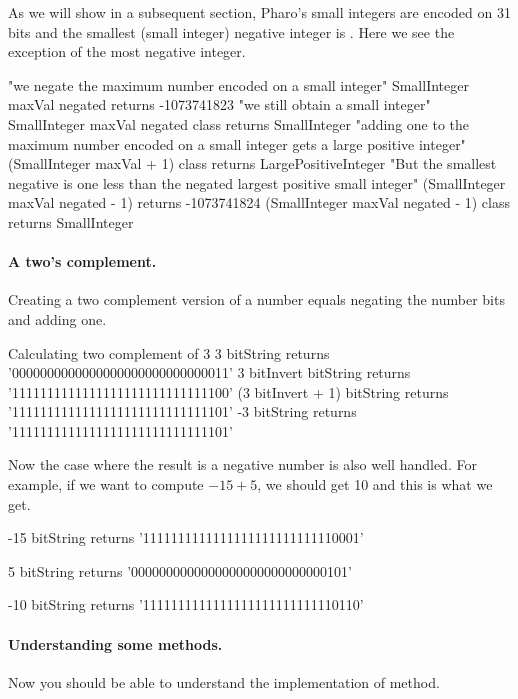 \documentclass[a4paper,10pt,twoside]{book}
\begin{document}
As we will show in a subsequent section, Pharo's small integers are encoded on 31 bits and the smallest (small integer) negative
integer is . Here we see the exception of the most negative integer.

\begin{code}{} 
"we negate the maximum number encoded on a small integer"
SmallInteger maxVal negated	 
	  	returns -1073741823
"we still obtain a small integer"		
SmallInteger maxVal negated class
		returns SmallInteger
"adding one to the maximum number encoded on a small integer gets a large positive integer"
(SmallInteger maxVal + 1) class
		returns LargePositiveInteger		
"But the smallest negative is one less than the negated largest positive small integer"		
(SmallInteger maxVal negated - 1) 
		returns -1073741824 
(SmallInteger maxVal negated - 1) class 
		returns SmallInteger 		 
\end{code}


\paragraph{A two's complement.}

Creating a two complement version of a number equals negating the number bits and adding one.
\begin{code}{Calculating two complement of 3}
3 bitString 
	returns '0000000000000000000000000000011'
3 bitInvert bitString 
	returns '1111111111111111111111111111100'
(3 bitInvert + 1) bitString 
	returns '1111111111111111111111111111101'
-3 bitString 
	returns '1111111111111111111111111111101'
\end{code}


Now the case where the result is a negative number is also well handled. For example, if we want to compute $-15 + 5$, we should get 10 and this is what we get.

\begin{code}
-15 bitString 
	returns '1111111111111111111111111110001'

5 bitString 
	returns '0000000000000000000000000000101'
	
-10 bitString 
	returns '1111111111111111111111111110110'
\end{code}



\paragraph{Understanding some methods.}
Now you should be able to understand the implementation of  method.
\end{document}
